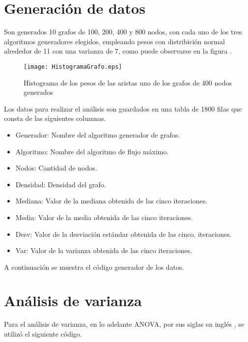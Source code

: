 \documentclass{article}
\begin{document}
\section*{Generación de datos}

Son generados 10 grafos de 100, 200, 400 y 800 nodos, con cada uno de los tres algoritmos generadores elegidos, empleando pesos con distribición normal alrededor de 11 con una varianza de 7, como puede observarse en la figura \pageref{Figura 1}.

\begin{figure}
\begin{center}
  \texttt{[image: HistogramaGrafo.eps]}
\end{center}
\vspace*{-8mm}
\caption{Histograma de los pesos de las aristas uno de los grafos de 400 nodos generados}
  \label{Figura 1} 
\end{figure}

Los datos para realizar el análisis son guardados en una tabla de 1800 filas que consta de las siguientes columnas.

\begin{itemize}
\item Generador: Nombre del algoritmo generador de grafos.	
\item Algoritmo: Nombre del algoritmo de flujo máximo.	
\item Nodos: Cantidad de nodos.	
\item Densidad: Densidad del grafo.
\item Mediana: Valor de la mediana obtenida de las cinco iteraciones.	
\item Media: Valor de la media obtenida de las cinco iteraciones.	
\item Desv: Valor de la desviación estándar obtenida de las cinco. iteraciones.
\item Var: Valor de la varianza obtenida de las cinco iteraciones.	
\end{itemize}

A continuación se muestra el código generador de los datos.

 

\section*{Análisis de varianza}

Para el análisis de varianza, en lo adelante ANOVA, por sus siglas en inglés \citep{anova}, se utilizó el siguiente código.
\end{document}
